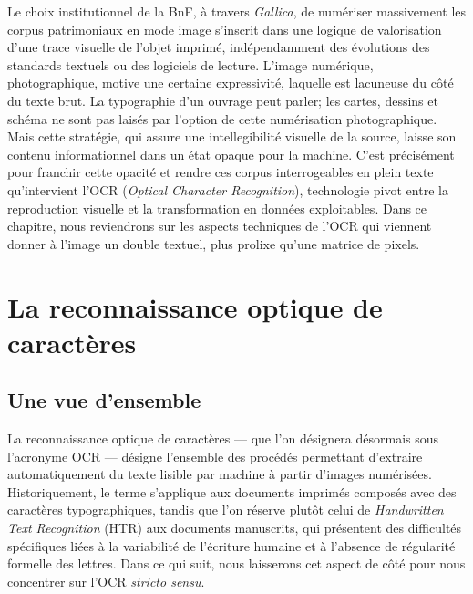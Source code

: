 Le choix institutionnel de la BnF, à travers \emph{Gallica}, de numériser massivement les corpus patrimoniaux en mode image s’inscrit dans une logique de valorisation d'une trace visuelle de l’objet imprimé, indépendamment des évolutions des standards textuels ou des logiciels de lecture. L’image numérique, photographique, motive une certaine expressivité, laquelle est lacuneuse du côté du texte brut. La typographie d'un ouvrage peut parler; les cartes, dessins et schéma ne sont pas laisés par l'option de cette numérisation photographique. Mais cette stratégie, qui assure une intellegibilité visuelle de la source, laisse son contenu informationnel dans un état opaque pour la machine. C’est précisément pour franchir cette opacité et rendre ces corpus interrogeables en plein texte qu’intervient l’OCR (\emph{Optical Character Recognition}), technologie pivot entre la reproduction visuelle et la transformation en données exploitables. Dans ce chapitre, nous reviendrons sur les aspects techniques de l'OCR qui viennent donner à l'image un double textuel, plus prolixe qu'une matrice de pixels.

\section{La reconnaissance optique de caractères}

\subsection{Une vue d’ensemble}

La reconnaissance optique de caractères — que l’on désignera désormais sous l’acronyme OCR — désigne l’ensemble des procédés permettant d’extraire automatiquement du texte lisible par machine à partir d’images numérisées. Historiquement, le terme s’applique aux documents imprimés composés avec des caractères typographiques, tandis que l’on réserve plutôt celui de \emph{Handwritten Text Recognition} (HTR) aux documents manuscrits, qui présentent des difficultés spécifiques liées à la variabilité de l’écriture humaine et à l’absence de régularité formelle des lettres. Dans ce qui suit, nous laisserons cet aspect de côté pour nous concentrer sur l’OCR \emph{stricto sensu}.

